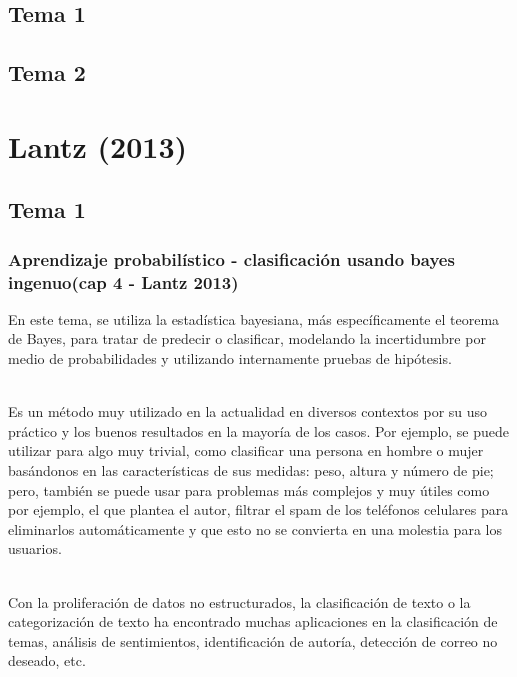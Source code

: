 \documentclass[10pt]{beamer}
\begin{document}
\subsection{Tema 1}
\begin{frame}
\frametitle{}
\end{frame}

\subsection{Tema 2}
\begin{frame}
\frametitle{}
\end{frame}

\section{Lantz (2013)}
\subsection{Tema 1}
\begin{frame}
\frametitle{Aprendizaje probabilístico - clasificación usando bayes ingenuo(cap 4 - Lantz 2013)}
En este tema, se utiliza la estadística bayesiana, más específicamente el teorema de Bayes, para tratar de predecir o clasificar, modelando la incertidumbre por medio de probabilidades y utilizando internamente pruebas de hipótesis. 

~\\Es un método muy utilizado en la actualidad en diversos contextos por su uso práctico y los buenos resultados en la mayoría de los casos. Por ejemplo, se puede utilizar para algo muy trivial, como clasificar una persona en hombre o mujer basándonos en las características de sus medidas: peso, altura y número de pie; pero, también se puede usar para problemas más complejos y muy útiles como por ejemplo, el que plantea el autor, filtrar el spam de los teléfonos celulares para eliminarlos automáticamente y que esto no se convierta en una molestia para los usuarios.

~\\Con la proliferación de datos no estructurados, la clasificación de texto o la categorización de texto ha encontrado muchas aplicaciones en la clasificación de temas, análisis de sentimientos, identificación de autoría, detección de correo no deseado, etc. 
\end{frame}
\end{document}

